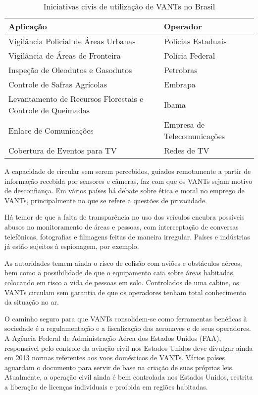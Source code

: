 \begin{table}
	\label{tab02}
    \begin{tabular}{ | p{9cm} | p{6cm} |}
    \hline
    Aplicação & Operador \\ \hline
    Vigilância Policial de Áreas Urbanas & Polícias Estaduais  \\ \hline
    Vigilância de Áreas de Fronteira & Polícia Federal  \\ \hline
    Inspeção de Oleodutos e Gasodutos & Petrobras  \\ \hline
    Controle de Safras Agrícolas & Embrapa  \\ \hline
    Levantamento de Recursos Florestais e 
    Controle de Queimadas & Ibama  \\ \hline
	Enlace de Comunicações & Empresa de Telecomunicações  \\ \hline
	Cobertura de Eventos para TV & Redes de TV  \\ \hline
    \hline
    \end{tabular}
    \caption{Iniciativas civis de utilização de VANTs no Brasil \cite{OliveiraFA}}
\end{table}

A capacidade de circular sem serem percebidos, guiados remotamente a partir de informação recebida por sensores e câmeras, faz com que os VANTs sejam motivo de desconfiança. Em vários países há debate sobre ética e moral no emprego de VANTs, principalmente no que se refere a questões de privacidade.

Há temor de que a falta de transparência no uso dos veículos encubra possíveis abusos no monitoramento de áreas e pessoas, com interceptação de conversas telefônicas, fotografias e filmagens feitas de maneira irregular. Países e indústrias já estão sujeitos à espionagem, por exemplo.

As autoridades temem ainda o risco de colisão com aviões e obstáculos aéreos, bem como a possibilidade de que o equipamento caia sobre áreas habitadas, colocando em risco a vida de pessoas em solo. Controlados de uma cabine, os VANTs circulam sem garantia de que os operadores tenham total conhecimento da situação no ar.

O caminho seguro para que VANTs consolidem-se como ferramentas benéficas à sociedade é a regulamentação e a fiscalização das aeronaves e de seus operadores.  A Agência Federal de Administração Aérea dos Estados Unidos (FAA), responsável pelo controle da aviação civil nos Estados Unidos deve divulgar ainda em 2013 normas referentes aos voos domésticos de VANTs. Vários países aguardam o documento para servir de base na criação de suas próprias leis. Atualmente, a operação civil ainda é bem controlada nos Estados Unidos, restrita a liberação de licenças individuais e proibida em regiões habitadas.

